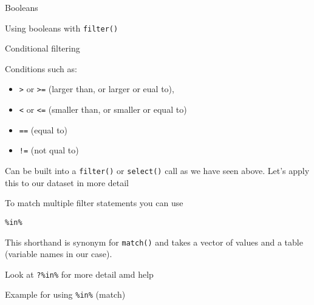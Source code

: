 \documentclass[ignorenonframetext,]{beamer}
\newenvironment{Shaded}{\begin{snugshade}}{\end{snugshade}}
\newcommand{\DecValTok}[1]{\textcolor[rgb]{0.00,0.00,0.81}{#1}}
\newcommand{\KeywordTok}[1]{\textcolor[rgb]{0.13,0.29,0.53}{\textbf{#1}}}
\newcommand{\NormalTok}[1]{#1}
\newcommand{\OperatorTok}[1]{\textcolor[rgb]{0.81,0.36,0.00}{\textbf{#1}}}
\newcommand{\StringTok}[1]{\textcolor[rgb]{0.31,0.60,0.02}{#1}}
\providecommand{\tightlist}{%
  \setlength{\itemsep}{0pt}\setlength{\parskip}{0pt}}
\begin{document}
\begin{frame}[fragile]{Booleans}
\begin{block}{Using booleans with \texttt{filter()}}
\end{block}

\begin{block}{Conditional filtering}

Conditions such as:

\begin{itemize}
\tightlist
\item
  \texttt{\textgreater{}} or \texttt{\textgreater{}=} (larger than, or
  larger or eual to),
\item
  \texttt{\textless{}} or \texttt{\textless{}=} (smaller than, or
  smaller or equal to)
\item
  \texttt{==} (equal to)
\item
  \texttt{!=} (not qual to)
\end{itemize}

Can be built into a \texttt{filter()} or \texttt{select()} call as we
have seen above. Let's apply this to our dataset in more detail

\end{block}

\begin{block}{To match multiple filter statements you can use}

\texttt{\%in\%}

This shorthand is synonym for \texttt{match()} and takes a vector of
values and a table (variable names in our case).

Look at \texttt{?\%in\%} for more detail amd help

\end{block}

\begin{block}{Example for using \texttt{\%in\%} (match)}

\begin{Shaded}
\end{Shaded}


\end{block}
\end{frame}
\end{document}
